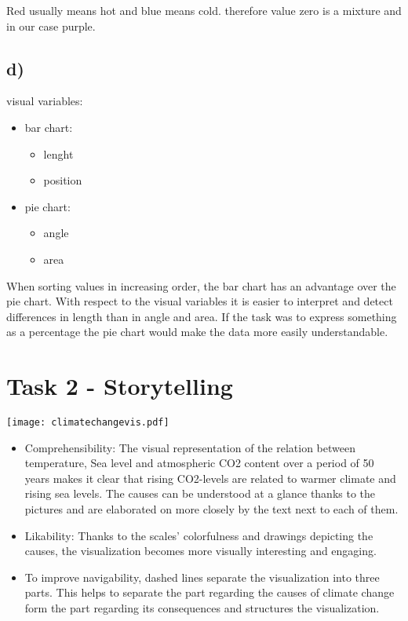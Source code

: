 \documentclass[a4paper]{article}
\begin{document}
\begin{itemize}
\begin{figure}[!h]
		\end{figure}
		Red usually means hot and blue means cold. therefore value zero is a mixture and in our case purple.
		
	\end{itemize}
	\subsection*{d)}
	
	visual variables:
	\begin{itemize}
		\item bar chart:
		\begin{itemize}
			\item lenght
			\item position
		\end{itemize}
		\item pie chart:
		\begin{itemize}
			\item angle
			\item area
		\end{itemize}
	\end{itemize}
	When sorting values in increasing order, the bar chart has an advantage over the pie chart. With respect to the visual variables it is easier to interpret and detect differences in length than in angle and area. If the task was to express something as a percentage the pie chart would make the data more easily understandable.
	
	
	\section*{Task 2 - Storytelling}
	
	\texttt{[image: climatechangevis.pdf]}
		\begin{itemize}		
				\item Comprehensibility: The visual representation of the relation between temperature, Sea level and atmospheric CO2 content over a period of 50 years makes it clear that rising CO2-levels are related to warmer climate and rising sea levels. The causes can be understood at a glance thanks to the pictures and are elaborated on more closely by the text next to each of them.
				\item Likability: Thanks to the scales' colorfulness and drawings depicting the causes, the visualization becomes more visually interesting and engaging.
				\item To improve navigability, dashed lines separate the visualization into three parts. This helps to separate the part regarding the causes of climate change form the part regarding its consequences and structures the visualization.

		\end{itemize}

%	
%	
\end{document}
